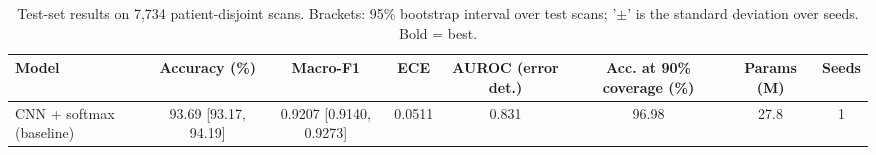 \begin{table}[t]
\centering
\small
\caption{Test-set results on 7,734 patient-disjoint scans. Brackets: 95\% bootstrap interval over test scans; '$\pm$' is the standard deviation over seeds. Bold = best.}
\label{tab:main}
\begin{tabular}{lccccccc}
\toprule
Model & Accuracy (\%) & Macro-F1 & ECE & AUROC (error det.) & Acc. at 90\% coverage (\%) & Params (M) & Seeds \\
\midrule
CNN + softmax (baseline) & 93.69 [93.17, 94.19] & 0.9207 [0.9140, 0.9273] & 0.0511 & 0.831 & 96.98 & 27.8 & 1 \\
\bottomrule
\end{tabular}
\end{table}